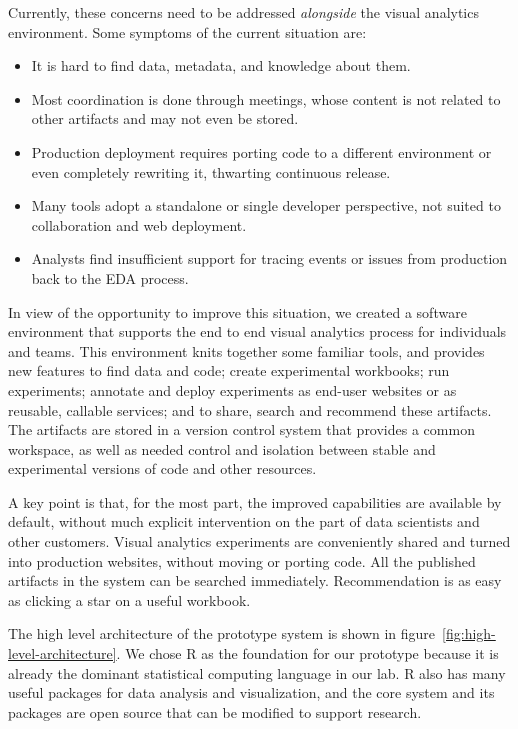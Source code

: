 Currently, these concerns need to be addressed \emph{alongside} the
visual analytics environment. Some symptoms of the current situation are:
\begin{itemize}
\item It is hard to find data, metadata, and knowledge about them.
\item Most coordination is done through meetings, whose content is not related to other artifacts and may not even be stored.
\item Production deployment requires porting code to a different environment or even completely rewriting it, thwarting continuous release.
\item Many tools adopt a standalone or single developer perspective,
not suited to collaboration and web deployment. 
\item Analysts find insufficient support for tracing events or issues from production back to the EDA process.
\end{itemize}

In view of the opportunity to improve this situation,
we created a software environment that supports the end to end
visual analytics process for individuals and teams.
This environment knits together some familiar tools, and 
provides new features to find data and code; create experimental workbooks;
run experiments; annotate and deploy experiments as end-user websites or
as reusable, callable services; and to share, search and recommend these artifacts. The artifacts are stored in a version
control system that provides a common workspace, as well as needed control
and isolation between stable and experimental versions of code and other
resources. 

A key point is that, for the most part, the improved capabilities are
available by default, without much explicit intervention on the part of
data scientists and other customers. Visual analytics experiments are
conveniently shared and turned into production websites, without moving
or porting code. All the published artifacts in the system can be
searched immediately. Recommendation is as easy as clicking a star
on a useful workbook.

The high level architecture of the prototype system
is shown in figure~\ref{fig:high-level-architecture}.
We chose R as the foundation for our prototype because it is already
the dominant statistical computing language in our lab.
R also has many useful packages for data analysis and visualization,
and the core system and its packages are open source that can be modified to
support research. 

